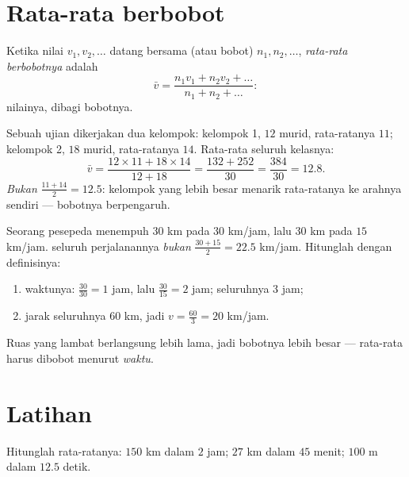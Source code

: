 \section{Rata-rata berbobot}

\begin{definition}\label{def:g8:speed:average}
Ketika nilai $v_1, v_2, \dots$ datang bersama  (atau bobot)
$n_1, n_2, \dots$, \emph{rata-rata berbobotnya}
adalah
\[
\bar v = \frac{n_1 v_1 + n_2 v_2 + \dots}{n_1 + n_2 + \dots} :
\]
 nilainya, dibagi  bobotnya.
\end{definition}

\begin{example}\label{ex:g8:speed:average}
Sebuah ujian dikerjakan dua kelompok: kelompok 1, $12$ murid,
rata-ratanya $11$; kelompok 2, $18$ murid, rata-ratanya $14$.
Rata-rata seluruh kelasnya:
\[
\bar v = \frac{12 \times 11 + 18 \times 14}{12 + 18}
= \frac{132 + 252}{30} = \frac{384}{30} = 12.8 .
\]
\emph{Bukan} $\frac{11 + 14}{2} = 12.5$: kelompok yang lebih besar
menarik rata-ratanya ke arahnya sendiri --- bobotnya berpengaruh.
\end{example}

\begin{example}\label{ex:g8:speed:twolegs}
Seorang pesepeda menempuh $30$ km pada $30$ km/jam, lalu $30$ km pada
$15$ km/jam.  seluruh perjalanannya \emph{bukan}
$\frac{30 + 15}{2} = 22.5$ km/jam. Hitunglah dengan definisinya:
\begin{enumerate}
  \item waktunya: $\frac{30}{30} = 1$ jam, lalu $\frac{30}{15} = 2$
        jam; seluruhnya $3$ jam;
  \item jarak seluruhnya $60$ km, jadi
        $v = \frac{60}{3} = 20$ km/jam.
\end{enumerate}
Ruas yang lambat berlangsung lebih lama, jadi bobotnya lebih besar ---
rata-rata  harus dibobot menurut \emph{waktu}.
\end{example}

\section{Latihan}

\begin{exercise}[$\star$]\label{exo:g8:speed:1}
Hitunglah  rata-ratanya: $150$ km dalam $2$ jam; $27$ km
dalam $45$ menit; $100$ m dalam $12.5$ detik.
\end{exercise}

